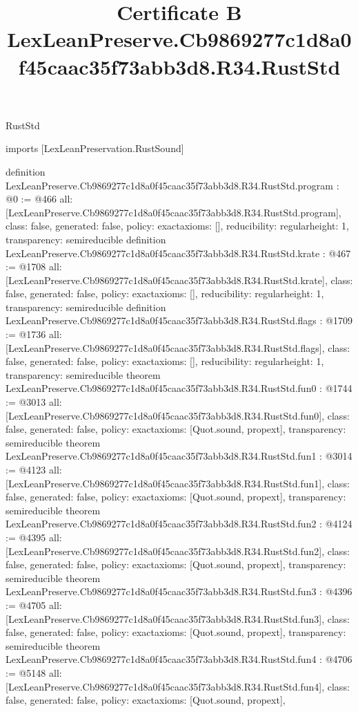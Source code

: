 \begin{lexlean}{RustStd}
\title{Certificate B LexLeanPreserve.Cb9869277c1d8a0f45caac35f73abb3d8.R34.RustStd}
\begin{coremodule}
imports [LexLeanPreservation.RustSound]

definition LexLeanPreserve.Cb9869277c1d8a0f45caac35f73abb3d8.R34.RustStd.program : @0 := @466 {
  all: [LexLeanPreserve.Cb9869277c1d8a0f45caac35f73abb3d8.R34.RustStd.program],
  class: false,
  generated: false,
  policy: exact{axioms: []},
  reducibility: regular{height: 1},
  transparency: semireducible
}
definition LexLeanPreserve.Cb9869277c1d8a0f45caac35f73abb3d8.R34.RustStd.krate : @467 := @1708 {
  all: [LexLeanPreserve.Cb9869277c1d8a0f45caac35f73abb3d8.R34.RustStd.krate],
  class: false,
  generated: false,
  policy: exact{axioms: []},
  reducibility: regular{height: 1},
  transparency: semireducible
}
definition LexLeanPreserve.Cb9869277c1d8a0f45caac35f73abb3d8.R34.RustStd.flags : @1709 := @1736 {
  all: [LexLeanPreserve.Cb9869277c1d8a0f45caac35f73abb3d8.R34.RustStd.flags],
  class: false,
  generated: false,
  policy: exact{axioms: []},
  reducibility: regular{height: 1},
  transparency: semireducible
}
theorem LexLeanPreserve.Cb9869277c1d8a0f45caac35f73abb3d8.R34.RustStd.fun0 : @1744 := @3013 {
  all: [LexLeanPreserve.Cb9869277c1d8a0f45caac35f73abb3d8.R34.RustStd.fun0],
  class: false,
  generated: false,
  policy: exact{axioms: [Quot.sound, propext]},
  transparency: semireducible
}
theorem LexLeanPreserve.Cb9869277c1d8a0f45caac35f73abb3d8.R34.RustStd.fun1 : @3014 := @4123 {
  all: [LexLeanPreserve.Cb9869277c1d8a0f45caac35f73abb3d8.R34.RustStd.fun1],
  class: false,
  generated: false,
  policy: exact{axioms: [Quot.sound, propext]},
  transparency: semireducible
}
theorem LexLeanPreserve.Cb9869277c1d8a0f45caac35f73abb3d8.R34.RustStd.fun2 : @4124 := @4395 {
  all: [LexLeanPreserve.Cb9869277c1d8a0f45caac35f73abb3d8.R34.RustStd.fun2],
  class: false,
  generated: false,
  policy: exact{axioms: [Quot.sound, propext]},
  transparency: semireducible
}
theorem LexLeanPreserve.Cb9869277c1d8a0f45caac35f73abb3d8.R34.RustStd.fun3 : @4396 := @4705 {
  all: [LexLeanPreserve.Cb9869277c1d8a0f45caac35f73abb3d8.R34.RustStd.fun3],
  class: false,
  generated: false,
  policy: exact{axioms: [Quot.sound, propext]},
  transparency: semireducible
}
theorem LexLeanPreserve.Cb9869277c1d8a0f45caac35f73abb3d8.R34.RustStd.fun4 : @4706 := @5148 {
  all: [LexLeanPreserve.Cb9869277c1d8a0f45caac35f73abb3d8.R34.RustStd.fun4],
  class: false,
  generated: false,
  policy: exact{axioms: [Quot.sound, propext]},
}
\end{coremodule}
\end{lexlean}
